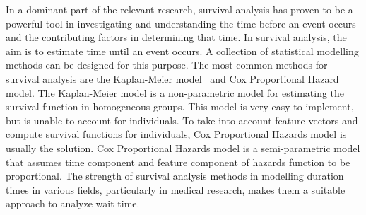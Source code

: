 In a dominant part of the relevant research, survival analysis has proven to be a powerful tool in investigating and understanding the time before an event occurs and the contributing factors in determining that time. In survival analysis, the aim is to estimate time until an event occurs. A collection of statistical modelling methods can be designed for this purpose. The most common methods for survival analysis are the Kaplan-Meier model~\cite{kaplan1958nonparametric} and Cox Proportional Hazard~\cite{cox1972regression} model. The Kaplan-Meier model is a non-parametric model for estimating the survival function in homogeneous groups. This model is very easy to implement, but is unable to account for individuals. To take into account feature vectors and compute survival functions for individuals, Cox Proportional Hazards model is usually the solution. Cox Proportional Hazards model is a semi-parametric model that assumes time component and feature component of hazards function to be proportional. The strength of survival analysis methods in modelling duration times in various fields, particularly in medical research, makes them a suitable approach to analyze wait time.

